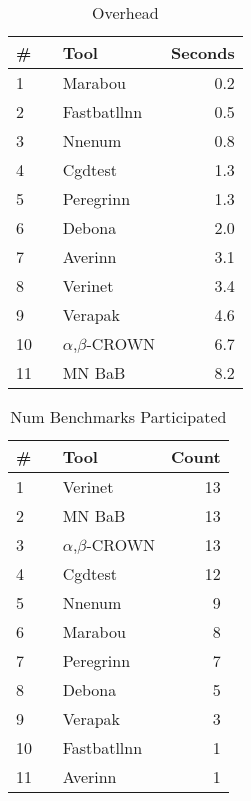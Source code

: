 
\begin{table}[h]
\begin{center}
\caption{Overhead} \label{tab:overhead}
{\setlength{\tabcolsep}{2pt}
\begin{tabular}[h]{@{}llr@{}}
\toprule
\textbf{\# ~} & \textbf{Tool} & \textbf{Seconds}\\
\midrule
1 & Marabou & 0.2 \\
2 & Fastbatllnn & 0.5 \\
3 & Nnenum & 0.8 \\
4 & Cgdtest & 1.3 \\
5 & Peregrinn & 1.3 \\
6 & Debona & 2.0 \\
7 & Averinn & 3.1 \\
8 & Verinet & 3.4 \\
9 & Verapak & 4.6 \\
10 & $\alpha$,$\beta$-CROWN & 6.7 \\
11 & MN BaB & 8.2 \\
\bottomrule
\end{tabular}
}
\end{center}
\end{table}




\begin{table}[h]
\begin{center}
\caption{Num Benchmarks Participated} \label{tab:stats0}
{\setlength{\tabcolsep}{2pt}
\begin{tabular}[h]{@{}llr@{}}
\toprule
\textbf{\# ~} & \textbf{Tool} & \textbf{Count}\\
\midrule
1 & Verinet & 13 \\
2 & MN BaB & 13 \\
3 & $\alpha$,$\beta$-CROWN & 13 \\
4 & Cgdtest & 12 \\
5 & Nnenum & 9 \\
6 & Marabou & 8 \\
7 & Peregrinn & 7 \\
8 & Debona & 5 \\
9 & Verapak & 3 \\
10 & Fastbatllnn & 1 \\
11 & Averinn & 1 \\
\bottomrule
\end{tabular}
}
\end{center}
\end{table}



